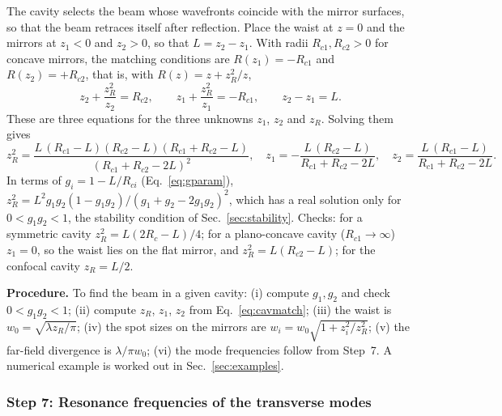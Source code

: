 \documentclass[11pt,a4paper]{article}
\begin{document}
	The cavity selects the beam whose wavefronts coincide with the mirror surfaces, so that the beam retraces itself after reflection. Place the waist at $z=0$ and the mirrors at $z_1<0$ and $z_2>0$, so that $L=z_2-z_1$. With radii $R_{c1},R_{c2}>0$ for concave mirrors, the matching conditions are $R(z_1)=-R_{c1}$ and $R(z_2)=+R_{c2}$, that is, with $R(z)=z+z_R^2/z$,
	\begin{equation}
		z_2+\frac{z_R^2}{z_2}=R_{c2},\qquad z_1+\frac{z_R^2}{z_1}=-R_{c1},\qquad z_2-z_1=L .
	\end{equation}
	These are three equations for the three unknowns $z_1$, $z_2$ and $z_R$. Solving them gives
	\begin{equation}
		z_R^2=\frac{L\,(R_{c1}-L)(R_{c2}-L)(R_{c1}+R_{c2}-L)}{(R_{c1}+R_{c2}-2L)^2},\quad
		z_1=-\frac{L\,(R_{c2}-L)}{R_{c1}+R_{c2}-2L},\quad
		z_2=\frac{L\,(R_{c1}-L)}{R_{c1}+R_{c2}-2L}.
		\label{eq:cavmatch}
	\end{equation}
	In terms of $g_i=1-L/R_{ci}$ (Eq.~\eqref{eq:gparam}), $z_R^2=L^2g_1g_2(1-g_1g_2)/(g_1+g_2-2g_1g_2)^2$, which has a real solution only for $0<g_1g_2<1$, the stability condition of Sec.~\ref{sec:stability}. Checks: for a symmetric cavity $z_R^2=L(2R_c-L)/4$; for a plano-concave cavity ($R_{c1}\to\infty$) $z_1=0$, so the waist lies on the flat mirror, and $z_R^2=L(R_{c2}-L)$; for the confocal cavity $z_R=L/2$.
	
	\textbf{Procedure.} To find the beam in a given cavity: (i) compute $g_1,g_2$ and check $0<g_1g_2<1$; (ii) compute $z_R$, $z_1$, $z_2$ from Eq.~\eqref{eq:cavmatch}; (iii) the waist is $w_0=\sqrt{\lambda z_R/\pi}$; (iv) the spot sizes on the mirrors are $w_i=w_0\sqrt{1+z_i^2/z_R^2}$; (v) the far-field divergence is $\lambda/\pi w_0$; (vi) the mode frequencies follow from Step~7. A numerical example is worked out in Sec.~\ref{sec:examples}.
	
	\subsubsection*{Step 7: Resonance frequencies of the transverse modes}
	
\end{document}
